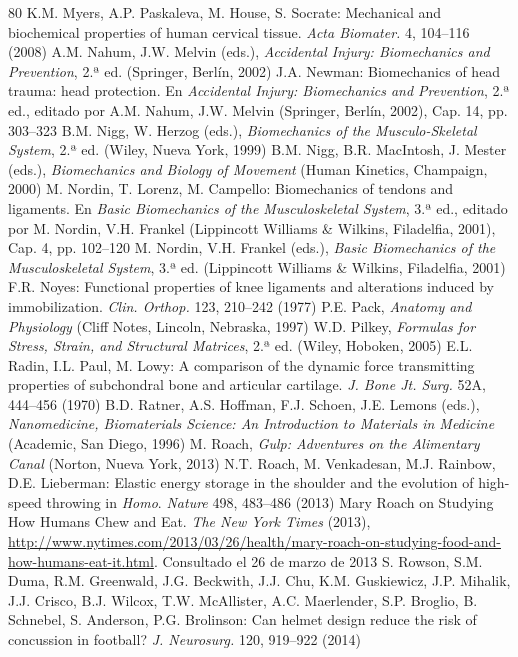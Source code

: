 \documentclass[12pt]{book}
\begin{document}
\begin{thebibliography}{80}
   K.M. Myers, A.P. Paskaleva, M. House, S. Socrate: Mechanical and biochemical properties of human cervical tissue. \textit{Acta Biomater.} 4, 104--116 (2008)
   A.M. Nahum, J.W. Melvin (eds.), \textit{Accidental Injury: Biomechanics and Prevention}, 2.ª ed. (Springer, Berlín, 2002)
   J.A. Newman: Biomechanics of head trauma: head protection. En \textit{Accidental Injury: Biomechanics and Prevention}, 2.ª ed., editado por A.M. Nahum, J.W. Melvin (Springer, Berlín, 2002), Cap. 14, pp. 303--323
   B.M. Nigg, W. Herzog (eds.), \textit{Biomechanics of the Musculo-Skeletal System}, 2.ª ed. (Wiley, Nueva York, 1999)
   B.M. Nigg, B.R. MacIntosh, J. Mester (eds.), \textit{Biomechanics and Biology of Movement} (Human Kinetics, Champaign, 2000)
   M. Nordin, T. Lorenz, M. Campello: Biomechanics of tendons and ligaments. En \textit{Basic Biomechanics of the Musculoskeletal System}, 3.ª ed., editado por M. Nordin, V.H. Frankel (Lippincott Williams \& Wilkins, Filadelfia, 2001), Cap. 4, pp. 102--120
   M. Nordin, V.H. Frankel (eds.), \textit{Basic Biomechanics of the Musculoskeletal System}, 3.ª ed. (Lippincott Williams \& Wilkins, Filadelfia, 2001)
   F.R. Noyes: Functional properties of knee ligaments and alterations induced by immobilization. \textit{Clin. Orthop.} 123, 210--242 (1977)
   P.E. Pack, \textit{Anatomy and Physiology} (Cliff Notes, Lincoln, Nebraska, 1997)
   W.D. Pilkey, \textit{Formulas for Stress, Strain, and Structural Matrices}, 2.ª ed. (Wiley, Hoboken, 2005)
   E.L. Radin, I.L. Paul, M. Lowy: A comparison of the dynamic force transmitting properties of subchondral bone and articular cartilage. \textit{J. Bone Jt. Surg.} 52A, 444--456 (1970)
   B.D. Ratner, A.S. Hoffman, F.J. Schoen, J.E. Lemons (eds.), \textit{Nanomedicine, Biomaterials Science: An Introduction to Materials in Medicine} (Academic, San Diego, 1996)
   M. Roach, \textit{Gulp: Adventures on the Alimentary Canal} (Norton, Nueva York, 2013)
   N.T. Roach, M. Venkadesan, M.J. Rainbow, D.E. Lieberman: Elastic energy storage in the shoulder and the evolution of high-speed throwing in \textit{Homo}. \textit{Nature} 498, 483--486 (2013)
   Mary Roach on Studying How Humans Chew and Eat. \textit{The New York Times} (2013), \url{http://www.nytimes.com/2013/03/26/health/mary-roach-on-studying-food-and-how-humans-eat-it.html}. Consultado el 26 de marzo de 2013
   S. Rowson, S.M. Duma, R.M. Greenwald, J.G. Beckwith, J.J. Chu, K.M. Guskiewicz, J.P. Mihalik, J.J. Crisco, B.J. Wilcox, T.W. McAllister, A.C. Maerlender, S.P. Broglio, B. Schnebel, S. Anderson, P.G. Brolinson: Can helmet design reduce the risk of concussion in football? \textit{J. Neurosurg.} 120, 919--922 (2014)

\end{thebibliography}
\end{document}
